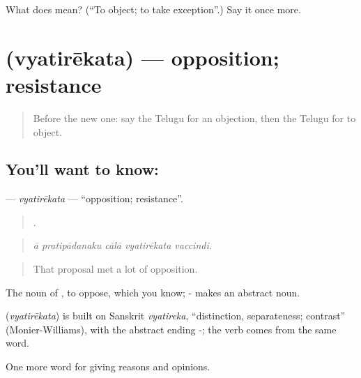 \begin{tcolorbox}[breakable,colback=teal!4,colframe=teal!35!black,title={Before you move on}]
What does  mean? (\textquotedblleft{}To object; to take exception\textquotedblright{}.) Say it once more.
\end{tcolorbox}
\section[\texorpdfstring{\te{వ్యతిరేకత} (vyatirēkata)}{వ్యతిరేకత (vyatirēkata)}]{ (vyatirēkata) — opposition; resistance}

\label{lesson:TE-C386-vyatirekata}



\begin{quote}
Before the new one: say the Telugu for an objection, then the Telugu for to object.
\end{quote}

\subsection*{You'll want to know: }
\textbf{} — \emph{vyatirēkata} — \textquotedblleft{}opposition; resistance\textquotedblright{}.

\begin{quote}
    .
\end{quote}

\begin{quote}
\emph{ā pratipādanaku cālā vyatirēkata vaccindi.}
\end{quote}

\begin{quote}
That proposal met a lot of opposition.
\end{quote}

The noun of , to oppose, which you know; - makes an abstract noun.

\begin{cousinweb}
\textbf{} (\emph{vyatirēkata}) is built on Sanskrit \emph{vyatireka}, \textquotedblleft{}distinction, separateness; contrast\textquotedblright{} (Monier-Williams), with the abstract ending -; the verb  comes from the same word.
\end{cousinweb}

\begin{grammarlens}[title={What you've built}]
One more word for giving reasons and opinions.
\end{grammarlens}

